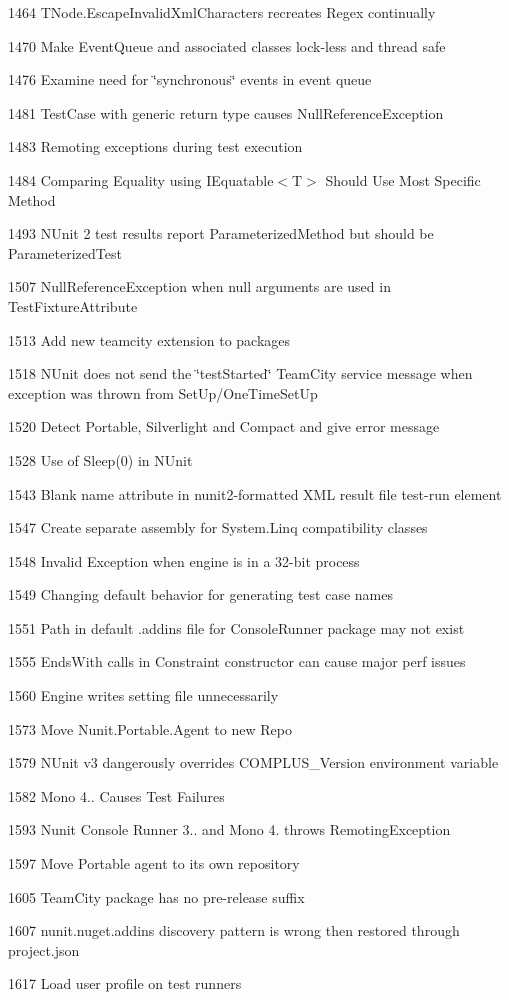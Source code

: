 \begin{DoxyItemize}
\item 1464 T\+Node.\+Escape\+Invalid\+Xml\+Characters recreates Regex continually
\item 1470 Make Event\+Queue and associated classes lock-\/less and thread safe
\item 1476 Examine need for \char`\"{}synchronous\char`\"{} events in event queue
\item 1481 Test\+Case with generic return type causes Null\+Reference\+Exception
\item 1483 Remoting exceptions during test execution
\item 1484 Comparing Equality using {\ttfamily I\+Equatable$<$T$>$} Should Use Most Specific Method
\item 1493 N\+Unit 2 test results report Parameterized\+Method but should be Parameterized\+Test
\item 1507 Null\+Reference\+Exception when null arguments are used in Test\+Fixture\+Attribute
\item 1513 Add new teamcity extension to packages
\item 1518 N\+Unit does not send the \char`\"{}test\+Started\char`\"{} Team\+City service message when exception was thrown from Set\+Up/\+One\+Time\+Set\+Up
\item 1520 Detect Portable, Silverlight and Compact and give error message
\item 1528 Use of Sleep(0) in N\+Unit
\item 1543 Blank name attribute in nunit2-\/formatted X\+ML result file test-\/run element
\item 1547 Create separate assembly for System.\+Linq compatibility classes
\item 1548 Invalid Exception when engine is in a 32-\/bit process
\item 1549 Changing default behavior for generating test case names
\item 1551 Path in default .addins file for Console\+Runner package may not exist
\item 1555 Ends\+With calls in Constraint constructor can cause major perf issues
\item 1560 Engine writes setting file unnecessarily
\item 1573 Move Nunit.\+Portable.\+Agent to new Repo
\item 1579 N\+Unit v3 dangerously overrides C\+O\+M\+P\+L\+U\+S\+\_\+\+Version environment variable
\item 1582 Mono 4.. Causes Test Failures
\item 1593 Nunit Console Runner 3.. and Mono 4. throws Remoting\+Exception
\item 1597 Move Portable agent to its own repository
\item 1605 Team\+City package has no pre-\/release suffix
\item 1607 nunit.\+nuget.\+addins discovery pattern is wrong then restored through project.\+json
\item 1617 Load user profile on test runners
\end{DoxyItemize}

